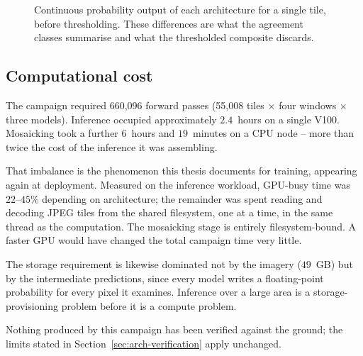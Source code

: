 \begin{figure}[!ht]
\centering
\caption[Per-model probability for a single tile]{Continuous probability output
of each architecture for a single tile, before thresholding. These differences
are what the agreement classes summarise and what the thresholded composite
discards.}
\label{fig:disc-permodel}
\end{figure}

\subsection{Computational cost}
\label{sec:disc-cost}

The campaign required 660{,}096 forward passes (55{,}008 tiles $\times$ four
windows $\times$ three models). Inference occupied approximately $2.4$~hours on
a single V100. Mosaicking took a further $6$~hours and $19$~minutes on a CPU
node -- more than twice the cost of the inference it was assembling.

That imbalance is the phenomenon this thesis documents for training, appearing
again at deployment. Measured on the inference workload, GPU-busy time was
$22$--$45\%$ depending on architecture; the remainder was spent reading and
decoding JPEG tiles from the shared filesystem, one at a time, in the same
thread as the computation. The mosaicking stage is entirely filesystem-bound. A
faster GPU would have changed the total campaign time very little.

The storage requirement is likewise dominated not by the imagery ($49$~GB) but
by the intermediate predictions, since every model writes a floating-point
probability for every pixel it examines. Inference over a large area is a
storage-provisioning problem before it is a compute problem.

Nothing produced by this campaign has been verified against the ground; the
limits stated in Section~\ref{sec:arch-verification} apply unchanged.
